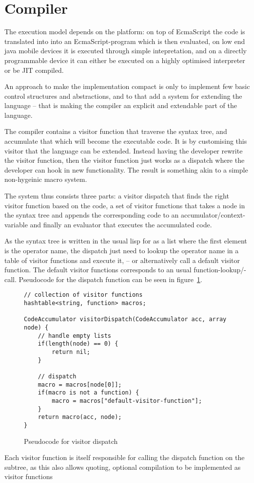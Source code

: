 \section{Compiler}

The execution model depends on the platform: on top of EcmaScript the code is translated into into an EcmaScript-program which is then evaluated, on low end java mobile devices it is executed through simple intepretation, and on a directly programmable device it can either be executed on a highly optimised interpreter or be JIT compiled.

An approach to make the implementation compact is only to implement few basic control structures and abstractions, and to that add a system for extending the language -- that is making the compiler an explicit and extendable part of the language.

The compiler contains a visitor function that traverse the syntax tree, and accumulate that which will become the executable code. It is by customising this visitor that the language can be extended. 
Instead having the developer rewrite the visitor function, then the visitor function just works as a dispatch where the developer can hook in new functionality.
The result is something akin to a simple non-hygeinic macro system. 

The system thus consists three parts: a visitor dispatch that finds the right visitor function based on the code, a set of visitor functions that takes a node in the syntax tree and appends the corresponding code to an accumulator/context-variable and finally an evaluator that executes the accumulated code.

As the syntax tree is written in the usual lisp for as a list where the first element is the operator name, the dispatch just need to lookup the operator name in a table of visitor functions and execute it, -- or alternatively call a default visitor function. The default visitor functions corresponds to an usual function-lookup/-call.
Pseudocode for the dispatch function can be seen in figure~\ref{visitor-dispatch}.


\begin{figure}
{\scriptsize
\begin{verbatim}
// collection of visitor functions
hashtable<string, function> macros;

CodeAccumulator visitorDispatch(CodeAccumulator acc, array node) {
    // handle empty lists
    if(length(node) == 0) {
        return nil;
    }

    // dispatch 
    macro = macros[node[0]];
    if(macro is not a function) {
        macro = macros["default-visitor-function"];
    }
    return macro(acc, node);
}
\end{verbatim}
}
\caption{Pseudocode for visitor dispatch}
\label{visitor-dispatch}
\end{figure}

Each visitor function is itself responsible for calling the dispatch function on the subtree, as this also allows quoting, optional compilation to be implemented as visitor functions
